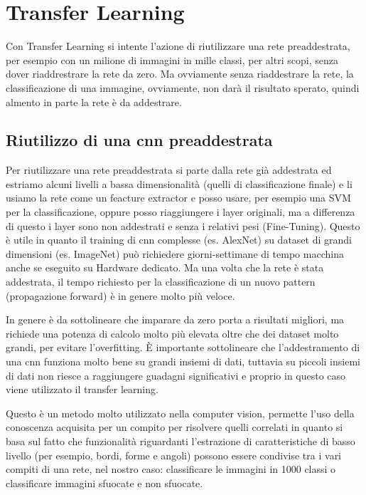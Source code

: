 \chapter{Transfer Learning}\label{transfer-learning}

Con Transfer Learning si intente l'azione di riutilizzare una rete preaddestrata, per esempio con un milione di immagini in mille classi, per altri scopi, senza dover riaddrestrare la rete da zero. Ma ovviamente senza riaddestrare la rete, la classificazione di una immagine, ovviamente, non darà il risultato sperato, quindi almento in parte la rete è da addestrare.

\section{Riutilizzo di una \gls{cnn} preaddestrata}\label{riutilizzo-di-una-cnn-preaddestrata}

Per riutilizzare una rete preaddestrata si parte dalla rete già addestrata ed estriamo alcuni livelli a bassa dimensionalità (quelli di classificazione finale) e li usiamo la rete come un feacture extractor  e posso usare, per esempio una SVM per la classificazione, oppure posso riaggiungere i layer originali, ma a differenza di questo i layer sono non addestrati e senza i relativi pesi (Fine-Tuning). Questo è utile in quanto il training di \gls{cnn} complesse (es. AlexNet) su dataset di grandi dimensioni (es. ImageNet) può richiedere giorni-settimane di tempo macchina anche se eseguito su Hardware dedicato. Ma una volta che la rete è stata addestrata, il tempo richiesto per la classificazione di un nuovo pattern (propagazione forward) è in genere molto più veloce\cite{yosinski_tl}\cite{unibo_maltoni_ml}.

In genere è da sottolineare che imparare da zero porta a risultati migliori, ma richiede una potenza di calcolo molto più  elevata oltre che dei dataset molto grandi, per evitare l'\gls{overfitting}. È importante sottolineare che l'addestramento di una \gls{cnn} funziona molto bene su grandi insiemi di dati, tuttavia su piccoli insiemi di dati non riesce a raggiungere guadagni significativi e proprio in questo caso viene utilizzato il transfer learning\cite{joel_tl}.

Questo è un metodo molto utilizzato nella computer vision, permette l'uso della conoscenza acquisita per un
compito per risolvere quelli correlati in quanto si basa sul fatto che
funzionalità riguardanti l'estrazione di caratteristiche di basso livello
(per esempio, bordi, forme e angoli) possono essere condivise tra i vari compiti di una rete, nel nostro caso: classificare le immagini in 1000 classi o classificare immagini sfuocate e non sfuocate\cite{patrini_tl}.




